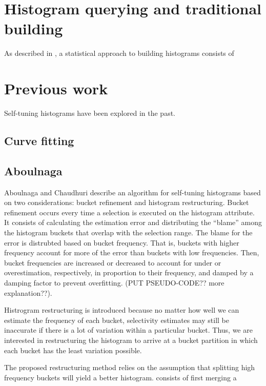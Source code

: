 \documentclass[twocolumn]{article}
\begin{document}
\section{Histogram querying and traditional building}\label{traditional-querying}

As described in \cite{Gibbons-97}, a statistical approach to building histograms consists of 
 
 
\section{Previous work}\label{prev-work}

Self-tuning histograms have been explored in the past.

	\subsection{Curve fitting}
		\cite{Aboulnaga-99}

	\subsection{Aboulnaga}
	
	Aboulnaga and Chaudhuri \cite{Aboulnaga-99} describe an algorithm for self-tuning histograms based on two
	considerations: bucket refinement and histogram restructuring. Bucket refinement occurs every time a selection
	is executed on the histogram attribute. It consists of calculating the estimation error and distributing the
	``blame'' among the histogram buckets that overlap with the selection range. The blame for the
	error is distrubted based on bucket frequency. That is, buckets with higher frequency account for more of
	the error than buckets with low frequencies. Then, bucket frequencies are increased or decreased to account
	for under or overestimation, respectively, in proportion to their frequency, and damped by a damping factor
	to prevent overfitting. (PUT PSEUDO-CODE?? more explanation??).
	
	Histrogram restructuring is introduced because no matter how well we can estimate the frequency of each bucket,
	selectivity estimates may still be inaccurate if there is a lot of variation within a particular bucket. Thus,
	we are interested in restructuring the histogram to arrive at a bucket partition in which each bucket has the
	least variation possible.
	
	The proposed restructuring method relies on the assumption that splitting high frequency buckets will yield
	a better histogram. 
	consists of first merging a 
 
\end{document}
